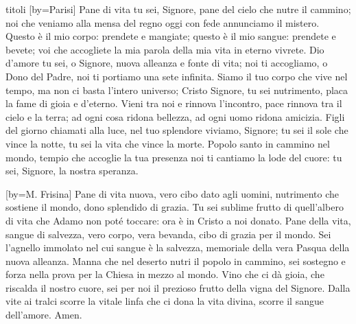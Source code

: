 \begin{songs}{titoli}
[by={Parisi}]
\beginverse
Pane di vita tu sei, Signore,
pane del cielo che nutre il cammino;
noi che veniamo alla mensa del regno
oggi con fede annunciamo il mistero.
\endverse
\beginverse
Questo è il mio corpo: prendete e mangiate;
questo è il mio sangue: prendete e bevete;
voi che accogliete la mia parola
della mia vita in eterno vivrete.
\endverse
\beginverse
Dio d'amore tu sei, o Signore,
nuova alleanza e fonte di vita;
noi ti accogliamo, o Dono del Padre,
noi ti portiamo una sete infinita.
\endverse
\beginverse
Siamo il tuo corpo che vive nel tempo,
ma non ci basta l'intero universo;
Cristo Signore, tu sei nutrimento,
placa la fame di gioia e d'eterno.
\endverse
\beginverse
Vieni tra noi e rinnova l'incontro,
pace rinnova tra il cielo e la terra;
ad ogni cosa ridona bellezza,
ad ogni uomo ridona amicizia.
\endverse
\beginverse
Figli del giorno chiamati alla luce,
nel tuo splendore viviamo, Signore;
tu sei il sole che vince la notte,
tu sei la vita che vince la morte.
\endverse
\beginverse
Popolo santo in cammino nel mondo,
tempio che accoglie la tua presenza
noi ti cantiamo la lode del cuore:
tu sei, Signore, la nostra speranza.
\endverse
\endsong

[by={M. Frisina}]
\beginverse
Pane di vita nuova,
vero cibo dato agli uomini,
nutrimento che sostiene il mondo,
dono splendido di grazia.
\endverse
\beginverse
Tu sei sublime frutto
di quell'albero di vita
che Adamo non poté toccare:
ora è in Cristo a noi donato.
\endverse
\beginchorus
Pane della vita,
sangue di salvezza,
vero corpo, vera bevanda,
cibo di grazia per il mondo.
\endchorus
\beginverse
Sei l'agnello immolato
nel cui sangue è la salvezza,
memoriale della vera Pasqua
della nuova alleanza.
\endverse
\beginverse
Manna che nel deserto
nutri il popolo in cammino,
sei sostegno e forza nella prova
per la Chiesa in mezzo al mondo.
\endverse
\beginverse
Vino che ci dà gioia,
che riscalda il nostro cuore,
sei per noi il prezioso frutto
della vigna del Signore.
\endverse
\beginverse
Dalla vite ai tralci
scorre la vitale linfa
che ci dona la vita divina,
scorre il sangue dell'amore.
\endverse
\beginverse*
Amen.
\endverse
\endsong


\end{songs}
